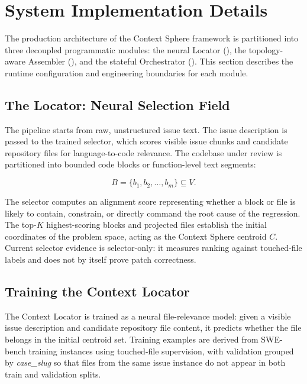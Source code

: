 \section{System Implementation Details}
\label{sec:implementation}

The production architecture of the Context Sphere framework is partitioned into three decoupled programmatic modules: the neural Locator (), the topology-aware Assembler (), and the stateful Orchestrator (). This section describes the runtime configuration and engineering boundaries for each module.

\subsection{The Locator: Neural Selection Field}

The pipeline starts from raw, unstructured issue text. The issue description is passed to the trained selector, which scores visible issue chunks and candidate repository files for language-to-code relevance. The codebase under review is partitioned into bounded code blocks or function-level text segments:

\begin{equation}
    B = \{b_1, b_2, \dots, b_m\} \subseteq V .
\end{equation}

The selector computes an alignment score representing whether a block or file is likely to contain, constrain, or directly command the root cause of the regression. The top-\(K\) highest-scoring blocks and projected files establish the initial coordinates of the problem space, acting as the Context Sphere centroid \(C\). Current selector evidence is selector-only: it measures ranking against touched-file labels and does not by itself prove patch correctness.

\subsection{Training the Context Locator}

The Context Locator is trained as a neural file-relevance model: given a visible issue description and candidate repository file content, it predicts whether the file belongs in the initial centroid set. Training examples are derived from SWE-bench training instances using touched-file supervision, with validation grouped by \textit{case\_slug} so that files from the same issue instance do not appear in both train and validation splits.

